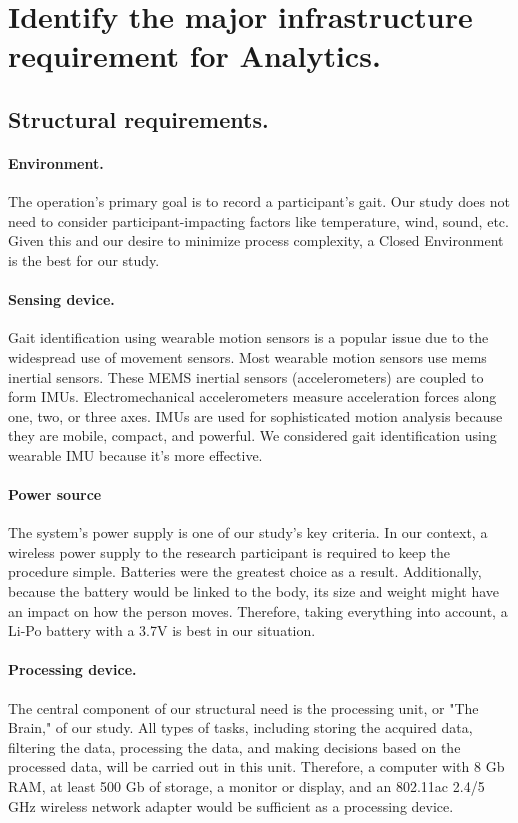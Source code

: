 \chapter{Identify the major infrastructure requirement for Analytics.}

\section{Structural requirements.}

\subsubsection{Environment.}
The operation's primary goal is to record a participant's gait. Our study does not need to consider participant-impacting factors like temperature, wind, sound, etc. Given this and our desire to minimize process complexity, a Closed Environment is the best for our study.

\subsubsection{Sensing device.}
Gait identification using wearable motion sensors is a popular issue due to the widespread use of movement sensors. Most wearable motion sensors use \ac{mems} inertial sensors. These MEMS inertial sensors (accelerometers) are coupled to form IMUs. Electromechanical accelerometers measure acceleration forces along one, two, or three axes. IMUs are used for sophisticated motion analysis because they are mobile, compact, and powerful. We considered gait identification using wearable IMU because it's more effective.

\subsubsection{Power source}
The system's power supply is one of our study's key criteria. In our context, a wireless power supply to the research participant is required to keep the procedure simple. Batteries were the greatest choice as a result. Additionally, because the battery would be linked to the body, its size and weight might have an impact on how the person moves. Therefore, taking everything into account, a Li-Po battery with a 3.7V is best in our situation.

\subsubsection{Processing device.}
The central component of our structural need is the processing unit, or "The Brain," of our study. All types of tasks, including storing  the acquired data, filtering the data, processing the data, and making decisions based on the processed data, will be carried out in this unit. Therefore, a computer with 8 Gb RAM, at least 500 Gb of storage, a monitor or display, and an 802.11ac 2.4/5 GHz wireless network adapter would be sufficient as a processing device.


